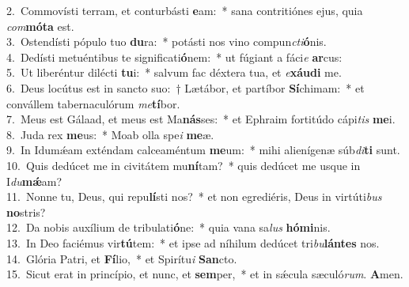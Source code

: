 {2.~}Commovísti terram, et conturbásti \textbf{e}am:~* sana contritiónes ejus, quia \textit{com}\textbf{mó}\textbf{ta} est.\\
{3.~}Ostendísti pópulo tuo \textbf{du}ra:~* potásti nos vino compun\textit{cti}\textbf{ó}nis.\\
{4.~}Dedísti metuéntibus te significati\textbf{ó}nem:~* ut fúgiant a fáci\textit{e} \textbf{ar}cus:\\
{5.~}Ut liberéntur dilécti \textbf{tu}i:~* salvum fac déxtera tua, et \textit{e}\textbf{xáu}\textbf{di} me.\\
{6.~}Deus locútus est in sancto suo:~† Lætábor, et partíbor \textbf{Sí}chimam:~* et convállem tabernaculórum \textit{me}\textbf{tí}bor.\\
{7.~}Meus est Gálaad, et meus est Ma\textbf{nás}ses:~* et Ephraim fortitúdo cápi\textit{tis} \textbf{me}i.\\
{8.~}Juda rex \textbf{me}us:~* Moab olla spe\textit{i} \textbf{me}æ.\\
{9.~}In Idumǽam exténdam calceaméntum \textbf{me}um:~* mihi alienígenæ súb\textit{di}\textbf{ti} sunt.\\
{10.~}Quis dedúcet me in civitátem mu\textbf{ní}tam?~* quis dedúcet me usque in I\textit{du}\textbf{mǽ}am?\\
{11.~}Nonne tu, Deus, qui repu\textbf{lí}sti nos?~* et non egrediéris, Deus in virtúti\textit{bus} \textbf{no}stris?\\
{12.~}Da nobis auxílium de tribulati\textbf{ó}ne:~* quia vana sa\textit{lus} \textbf{hó}\textbf{mi}nis.\\
{13.~}In Deo faciémus vir\textbf{tú}tem:~* et ipse ad níhilum dedúcet tri\textit{bu}\textbf{lán}\textbf{tes} nos.\\
{14.~}Glória Patri, et \textbf{Fí}lio,~* et Spirítu\textit{i} \textbf{San}cto.\\
{15.~}Sicut erat in princípio, et nunc, et \textbf{sem}per,~* et in sǽcula sæculó\textit{rum}. \textbf{A}men.\\
